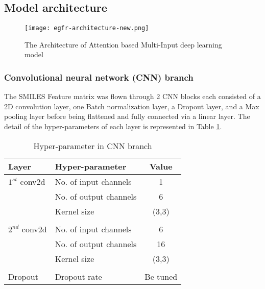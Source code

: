 \documentclass[conference]{IEEEtran}
\begin{document}
\subsection{Model architecture}

\begin{figure*}[htbp]
    \centering
    \texttt{[image: egfr-architecture-new.png]}
    \caption{The Architecture of Attention based Multi-Input deep learning model}
    \label{fig:full_arch}
\end{figure*}

\subsubsection{Convolutional neural network (CNN) branch}
The SMILES Feature matrix was flown through 2 CNN blocks each consisted of a 2D convolution layer, one Batch normalization layer, a Dropout layer, and a Max pooling layer before being flattened and fully connected via a linear layer. The detail of the hyper-parameters of each layer is represented in Table \ref{cnnhp}. 

\begin{table}[htbp]
    \caption{Hyper-parameter in CNN branch}
    \begin{center}
        \begin{tabular}{llc}
            \hline
            \textbf{Layer}                               & \textbf{Hyper-parameter}          & \textbf{Value} \\
            \hline
            $1^{st}$ conv2d                     & No. of input channels  & 1     \\
                                                & No. of output channels & 6     \\
                                                & Kernel size            & (3,3) \\
                                                &                         &         \\
            $2^{nd}$ conv2d                     & No. of input channels  & 6     \\
                                                & No. of output channels & 16    \\
                                                & Kernel size            & (3,3) \\
                                                &                         &         \\
            Dropout                             & Dropout rate           & Be tuned   \\
            \hline
        \end{tabular}
        \label{cnnhp}
    \end{center}
\end{table}
\end{document}
